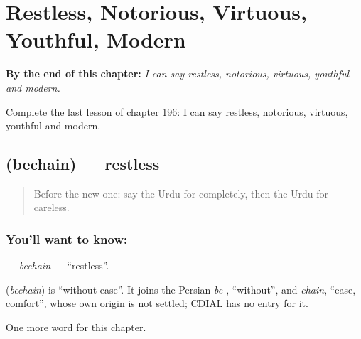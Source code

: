 
\chapter{Restless, Notorious, Virtuous, Youthful, Modern}
\label{ch:ur-restless-notorious-virtuous-youthful-modern}

\begin{chapteropening}
\textbf{By the end of this chapter:} \emph{I can say restless, notorious, virtuous, youthful and modern.}

Complete the last lesson of chapter 196: I can say restless, notorious, virtuous, youthful and modern.
\end{chapteropening}

\section[\texorpdfstring{\ur{بے} \ur{چین} (bechain)}{بے چین (bechain)}]{  (bechain) — restless}

\label{lesson:UR-C196-bechain}



\begin{quote}
Before the new one: say the Urdu for completely, then the Urdu for careless.
\end{quote}

\subsection*{You'll want to know:  }
\textbf{ } — \emph{bechain} — \textquotedblleft{}restless\textquotedblright{}.

\begin{cousinweb}
\textbf{ } (\emph{bechain}) is \textquotedblleft{}without ease\textquotedblright{}. It joins the Persian \emph{be-}, \textquotedblleft{}without\textquotedblright{}, and \emph{chain}, \textquotedblleft{}ease, comfort\textquotedblright{}, whose own origin is not settled; CDIAL has no entry for it.
\end{cousinweb}

\begin{grammarlens}[title={What you've built}]
One more word for this chapter.
\end{grammarlens}


